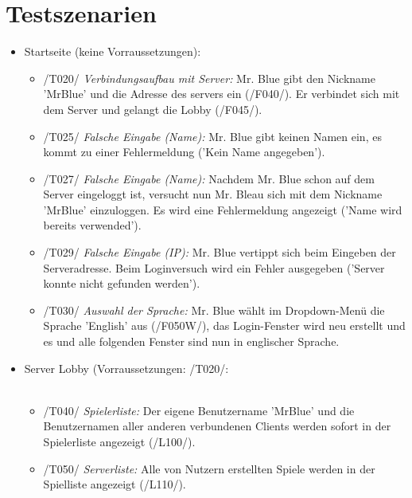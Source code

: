 \documentclass{article}
\begin{document}
\section{Testszenarien}
\begin{itemize}
	\item Startseite (keine Vorraussetzungen): \\
	\begin{itemize}
	
		\item /T020/ \textit{Verbindungsaufbau mit Server:} Mr. Blue gibt den Nickname 'MrBlue' und die Adresse des servers ein (/F040/). Er verbindet sich mit dem Server und gelangt die Lobby (/F045/). 
		
		\item /T025/ \textit{Falsche Eingabe (Name):} Mr. Blue gibt keinen Namen ein, es kommt zu einer Fehlermeldung ('Kein Name angegeben').
		
		\item /T027/ \textit{Falsche Eingabe (Name):} Nachdem Mr. Blue schon auf dem Server eingeloggt ist, versucht nun Mr. Bleau sich mit dem Nickname 'MrBlue' einzuloggen. Es wird eine Fehlermeldung angezeigt ('Name wird bereits verwended').
		
		\item /T029/ \textit{Falsche Eingabe (IP):} Mr. Blue vertippt sich beim Eingeben der Serveradresse. Beim Loginversuch wird ein Fehler ausgegeben ('Server konnte nicht gefunden werden').
		
		\item /T030/ \textit{Auswahl der Sprache:} Mr. Blue wählt im Dropdown-Menü die Sprache 'English' aus (/F050W/), das Login-Fenster wird neu erstellt und es und alle folgenden Fenster sind nun in englischer Sprache.
			  
			  
	\end{itemize}

	\item Server Lobby (Vorraussetzungen: /T020/: \\ \\
	\begin{itemize}
	
		\item /T040/ \textit{Spielerliste:} Der eigene Benutzername 'MrBlue' und die Benutzernamen aller anderen verbundenen Clients werden sofort in der Spielerliste angezeigt (/L100/).
		
		\item /T050/ \textit{Serverliste:} Alle von Nutzern erstellten Spiele werden in der Spielliste angezeigt (/L110/).
	

\end{itemize}
\end{itemize}
\end{document}
